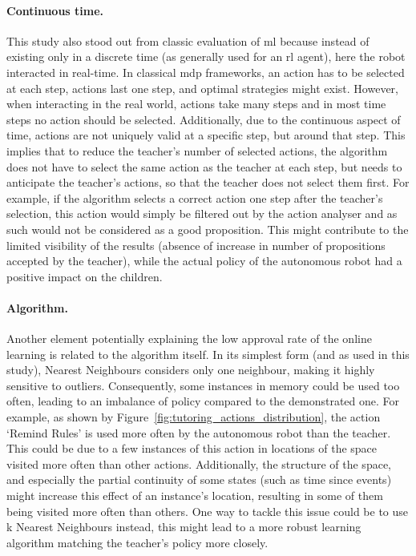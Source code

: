 
\paragraph{Continuous time.}

This study also stood out from classic evaluation of \gls{ml} because instead of existing only in a discrete time (as generally used for an \gls{rl} agent), here the robot interacted in real-time. In classical \gls{mdp} frameworks, an action has to be selected at each step, actions last one step, and optimal strategies might exist. However, when interacting in the real world, actions take many steps and in most time steps no action should be selected. Additionally, due to the continuous aspect of time, actions are not uniquely valid at a specific step, but around that step. This implies that to reduce the teacher's number of selected actions, the algorithm does not have to select the same action as the teacher at each step, but needs to anticipate the teacher's actions, so that the teacher does not select them first. For example, if the algorithm selects a correct action one step after the teacher's selection, this action would simply be filtered out by the action analyser and as such would not be considered as a good proposition. This might contribute to the limited visibility of the results (absence of increase in number of propositions accepted by the teacher), while the actual policy of the autonomous robot had a positive impact on the children.


\paragraph{Algorithm.}

Another element potentially explaining the low approval rate of the online learning is related to the algorithm itself. In its simplest form (and as used in this study), Nearest Neighbours considers only one neighbour, making it highly sensitive to outliers. Consequently, some instances in memory could be used too often, leading to an imbalance of policy compared to the demonstrated one. For example, as shown by Figure~\ref{fig:tutoring_actions_distribution}, the action `Remind Rules' is used more often by the autonomous robot than the teacher. This could be due to a few instances of this action in locations of the space visited more often than other actions. Additionally, the structure of the space, and especially the partial continuity of some states (such as time since events) might increase this effect of an instance's location, resulting in some of them being visited more often than others. One way to tackle this issue could be to use k Nearest Neighbours instead, this might lead to a more robust learning algorithm matching the teacher's policy more closely.

